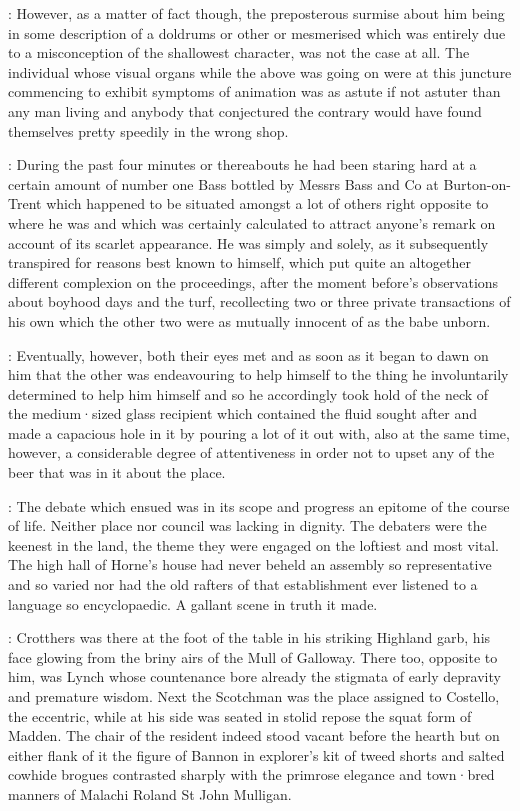 

:
However,
as a matter of fact though,
the preposterous surmise about him
being in some description of a doldrums or other or mesmerised which was
entirely due to a misconception of the shallowest character,
was not the
case at all.
The individual whose visual organs while the above was going
on were at this juncture commencing to exhibit symptoms of animation was
as astute if not astuter than any man living and anybody that conjectured the contrary
would have found themselves pretty speedily in the wrong shop.

:
During the past four minutes or thereabouts he had been staring
hard at a certain amount of number one Bass bottled by Messrs Bass and Co
at Burton-on-Trent which happened to be situated amongst a lot of others
right opposite to where he was and which was certainly calculated to
attract anyone's remark on account of its scarlet appearance.
He was
simply and solely,
as it subsequently transpired for reasons best known
to himself,
which put quite an altogether different complexion on the
proceedings,
after the moment before's observations about boyhood days
and the turf,
recollecting two or three private transactions of his own
which the other two were as mutually innocent of
as the babe unborn.

:
Eventually,
however,
both their eyes met and as soon as it began to dawn
on him that the other was endeavouring to help himself to the thing he
involuntarily determined to help him himself and so he accordingly took
hold of the neck of the medium·sized glass recipient which contained the
fluid sought after and made a capacious hole in it by pouring a lot of it
out with,
also at the same time,
however,
a considerable degree of
attentiveness in order not to upset any of the beer that was in it about
the place.


:
The debate which ensued was in its scope and progress an epitome of the
course of life.
Neither place nor council was lacking in dignity.
The debaters were the keenest in the land,
the theme they were engaged on the
loftiest and most vital.
The high hall of Horne's house had never beheld
an assembly so representative and so varied nor had the old rafters of
that establishment ever listened to a language so encyclopaedic.
A
gallant scene in truth it made.

:
Crotthers was there at the foot of the
table in his striking Highland garb,
his face glowing from the briny airs
of the Mull of Galloway.
There too,
opposite to him,
was Lynch whose
countenance bore already the stigmata of early depravity and premature
wisdom.
Next the Scotchman was the place assigned to Costello,
the
eccentric,
while at his side was seated in stolid repose the squat form
of Madden.
The chair of the resident indeed stood vacant before the hearth
but on either flank of it the figure of Bannon in explorer's kit
of tweed shorts and salted cowhide brogues contrasted sharply with the
primrose elegance and town·bred manners of Malachi Roland St John
Mulligan.

